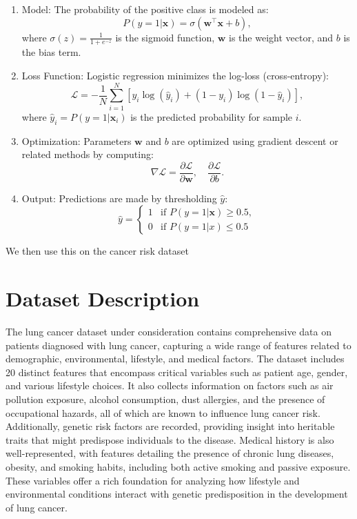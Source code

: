 \documentclass[conference]{IEEEtran}
\begin{document}
\begin{enumerate}
    \item Model: The probability of the positive class is modeled as:
    \[
    P(y=1|\mathbf{x}) = \sigma(\mathbf{w}^\top \mathbf{x} + b),
    \]
    where \( \sigma(z) = \frac{1}{1 + e^{-z}} \) is the sigmoid function, \( \mathbf{w} \) is the weight vector, and \( b \) is the bias term.

    \item Loss Function: Logistic regression minimizes the log-loss (cross-entropy):
    \[
    \mathcal{L} = -\frac{1}{N} \sum_{i=1}^N \left[ y_i \log(\hat{y}_i) + (1 - y_i) \log(1 - \hat{y}_i) \right],
    \]
    where \( \hat{y}_i = P(y=1|\mathbf{x}_i) \) is the predicted probability for sample \( i \).

    \item Optimization: Parameters \( \mathbf{w} \) and \( b \) are optimized using gradient descent or related methods by computing:
    \[
    \nabla \mathcal{L} = \frac{\partial \mathcal{L}}{\partial \mathbf{w}}, \quad \frac{\partial \mathcal{L}}{\partial b}.
    \]

    \item Output: Predictions are made by thresholding \( \hat{y} \):
    \[
    \hat{y} =
    \begin{cases}
    1 & \text{if } P(y=1|\mathbf{x}) \geq 0.5, \\
    0 & \text{if } P(y=1|x)\le 0.5
    \end{cases}
    \]
\end{enumerate}
We then use this on the cancer risk dataset

\section{Dataset Description}

The lung cancer dataset\cite{LungCancerPrediction} under consideration contains comprehensive data on patients diagnosed with lung cancer, capturing a wide range of features related to demographic, environmental, lifestyle, and medical factors. The dataset includes 20 distinct features that encompass critical variables such as patient age, gender, and various lifestyle choices. It also collects information on factors such as air pollution exposure, alcohol consumption, dust allergies, and the presence of occupational hazards, all of which are known to influence lung cancer risk. Additionally, genetic risk factors are recorded, providing insight into heritable traits that might predispose individuals to the disease. Medical history is also well-represented, with features detailing the presence of chronic lung diseases, obesity, and smoking habits, including both active smoking and passive exposure. These variables offer a rich foundation for analyzing how lifestyle and environmental conditions interact with genetic predisposition in the development of lung cancer.
\end{document}
